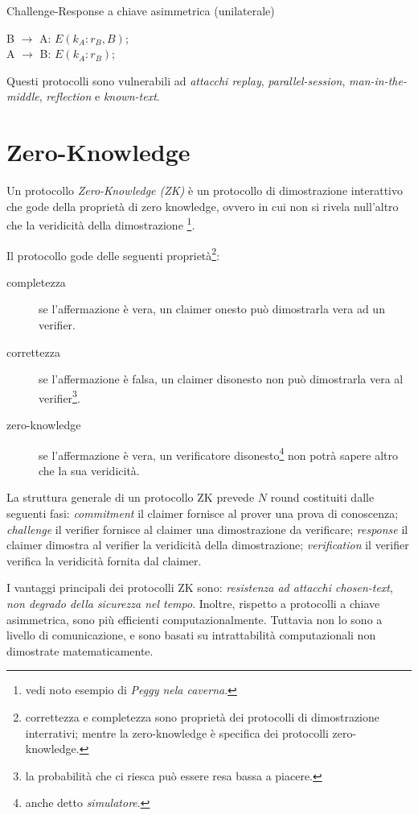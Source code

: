 \bigskip
\begin{algorithm}[H]
  \caption{Challenge-Response a chiave asimmetrica (unilaterale)}
  \label{alg:authentication-challenge-response-unilateral-asymmetric}
  \SetAlgoNoLine
  B $\rightarrow$ A: $E(k_{A}:r_{B},B)$;\\
  A $\rightarrow$ B: $E(k_{A}:r_{B})$;\\
\end{algorithm}
\bigskip

Questi protocolli sono vulnerabili ad \textit{attacchi replay}, \textit{parallel-session}, \textit{man-in-the-middle}, \textit{reflection} e \textit{known-text}.


\section{Zero-Knowledge}
Un protocollo \textit{Zero-Knowledge (ZK)} è un protocollo di dimostrazione interattivo che gode della proprietà di zero knowledge, ovvero in cui non si rivela null'altro che la veridicità della dimostrazione \footnote{vedi noto esempio di \textit{Peggy nela caverna}.}.

Il protocollo gode delle seguenti proprietà\footnote{correttezza e completezza sono proprietà dei protocolli di dimostrazione interrativi; mentre la zero-knowledge è specifica dei protocolli zero-knowledge.}:
\begin{description}
  \item[completezza] se l'affermazione è vera, un claimer onesto può dimostrarla vera ad un verifier.
  \item[correttezza] se l'affermazione è falsa, un claimer disonesto non può dimostrarla vera al verifier\footnote{la probabilità che ci riesca può essere resa bassa a piacere.}.
  \item[zero-knowledge] se l'affermazione è vera, un verificatore disonesto\footnote{anche detto \textit{simulatore}.} non potrà sapere altro che la sua veridicità.
\end{description}

La struttura generale di un protocollo ZK prevede $N$ round costituiti dalle seguenti fasi: \textit{commitment} il claimer fornisce al prover una prova di conoscenza; \textit{challenge} il verifier fornisce al claimer una dimostrazione da verificare; \textit{response} il claimer dimostra al verifier la veridicità della dimostrazione; \textit{verification} il verifier verifica la veridicità fornita dal claimer.

I vantaggi principali dei protocolli ZK sono: \textit{resistenza ad attacchi chosen-text}, \textit{non degrado della sicurezza nel tempo}. Inoltre, rispetto a protocolli a chiave asimmetrica, sono più efficienti computazionalmente.
Tuttavia non lo sono a livello di comunicazione, e sono basati su intrattabilità computazionali non dimostrate matematicamente.


